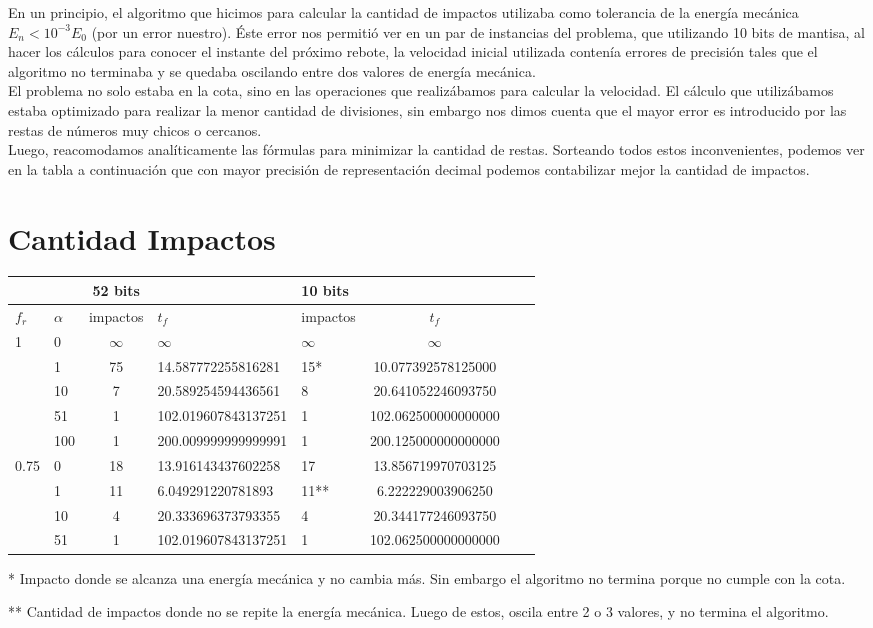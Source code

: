 \documentclass[10pt, a4paper,english,spanish]{article}
\begin{document}
En un principio, el algoritmo que hicimos para calcular la cantidad de impactos utilizaba como tolerancia de la energía mecánica $E_n < 10^{-3}E_0$ (por un error nuestro).
Éste error nos permitió ver en un par de instancias del problema, que utilizando 10 bits de mantisa, al hacer los cálculos para conocer el instante del próximo rebote, la velocidad inicial utilizada contenía errores de precisión tales que el algoritmo no terminaba y se quedaba oscilando entre dos valores de energía mecánica.\\

El problema no solo estaba en la cota, sino en las operaciones que realizábamos para calcular la velocidad. El cálculo que utilizábamos estaba optimizado para realizar la menor cantidad de divisiones, sin embargo nos dimos cuenta que el mayor error es introducido por las restas de números muy chicos o cercanos.\\

Luego, reacomodamos analíticamente las fórmulas para minimizar la cantidad de restas.
Sorteando todos estos inconvenientes, podemos ver en la tabla a continuación que con mayor precisión de representación decimal podemos contabilizar mejor la cantidad de impactos.

\section{Cantidad Impactos}

\begin{center}
\begin{tabular}{|ll|cl|lc|c|c|}
\hline
 & & 52 bits &  & 10 bits &  \\ \hline
$f_r$ & $\alpha$ & impactos & $t_f$ & impactos & $t_f$ \\ \hline
1 & 0 & {$\infty$} & {$\infty$} & {$\infty$} & {$\infty$} \\
  & 1 & {75} & {14.587772255816281} & {15*} & {10.077392578125000}\\
  & 10 & {7} & {20.589254594436561} & {8} & {20.641052246093750}\\
  & 51 & {1} & {102.019607843137251} & {1} & {102.062500000000000}\\
  & 100 & {1} & {200.009999999999991} & {1} & {200.125000000000000}\\ \hline
0.75 & 0 & {18} & {13.916143437602258} & {17} & {13.856719970703125}\\
     & 1 & {11} & {6.049291220781893} & {11**} & {6.222229003906250}\\
     & 10 & {4} & {20.333696373793355} & {4} & {20.344177246093750}\\
     & 51 & {1} & {102.019607843137251} & {1} & {102.062500000000000}\\ \hline
\end{tabular}

* Impacto donde se alcanza una energía mecánica y no cambia más. Sin embargo el algoritmo no termina porque no cumple con la cota.

** Cantidad de impactos donde no se repite la energía mecánica. Luego de estos, oscila entre 2 o 3 valores, y no termina el algoritmo.
\end{center}
\end{document}

